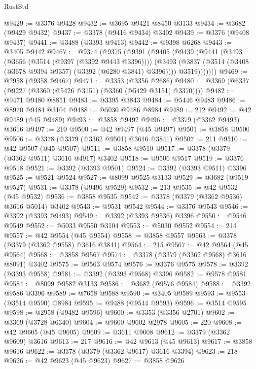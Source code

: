\begin{lexlean}{RustStd}
\begin{coremodule}
@9429 := @3376 @9428
@9432 := @3695 @9421 @8450 @3133
@9434 := @3682 (@9429 @9432)
@9437 := @3378 (@9416 @9434) @3402
@9439 := @3376 (@9408 @9437)
@9441 := @3488 (@3393 @9413)
@9442 := @9398 @6268
@9443 := @3405 @9442
@9467 := @9374
    (@9375
      (@9391
        (@9405
          (@9439
            (@9441
              (@3493
                (@3656 (@3514 (@9397 (@3392 @9443 @3396))))
                (@3493
                  (@3837 (@3514 (@3408 (@3678 @9394 @9357) (@3392 (@6280 @3841) @3396))))
                  @3519)))))))
@9469 := @2958 (@9358 @9467)
@9471 := @3353 (@3356 @2686)
@9480 := @3369 (@6337 (@9227 (@3360 (@5426 @3151) (@3360 (@5429 @3151) @3370))))
@9482 := @9471 @9480 @8851
@9483 := @3395 @3843
@9484 := @5446 @9483
@9486 := @8970 @9484 @3104
@9488 := @5030 @9486 @8984
@9489 := 212
@9492 := @42 @9489 (@45 @9489)
@9493 := @3858 @9492
@9496 := @3379 (@3362 @9493) @3616
@9497 := 210
@9500 := @42 @9497 (@45 @9497)
@9501 := @3858 @9500
@9506 := @3378 (@3379 (@3362 @9501) @3616 @3841)
@9507 := 211
@9510 := @42 @9507 (@45 @9507)
@9511 := @3858 @9510
@9517 := @3378 (@3379 (@3362 @9511) @3616 @4917) @3402
@9518 := @9506 @9517
@9519 := @3376 @9518
@9521 := @3392 (@3393 @9501)
@9524 := @3392 (@3393 @9511) @3396
@9525 := @9521 @9524
@9527 := @8099 @9525 @3133
@9529 := @3682 (@9519 @9527)
@9531 := @3378 (@9496 @9529)
@9532 := 213
@9535 := @42 @9532 (@45 @9532)
@9536 := @3858 @9535
@9542 := @3378 (@3379 (@3362 @9536) @3616 @5014) @3402
@9543 := @9531 @9542
@9544 := @3376 @9543
@9546 := @3392 (@3393 @9493)
@9549 := @3392 (@3393 @9536) @3396
@9550 := @9546 @9549
@9552 := @5033 @9550 @3104
@9553 := @5030 @9552
@9554 := 214
@9557 := @42 @9554 (@45 @9554)
@9558 := @3858 @9557
@9563 := @3378 (@3379 (@3362 @9558) @3616 @3841)
@9564 := 215
@9567 := @42 @9564 (@45 @9564)
@9568 := @3858 @9567
@9574 := @3378 (@3379 (@3362 @9568) @3616 @8091) @3402
@9575 := @9563 @9574
@9576 := @3376 @9575
@9578 := @3392 (@3393 @9558)
@9581 := @3392 (@3393 @9568) @3396
@9582 := @9578 @9581
@9584 := @8099 @9582 @3133
@9586 := @3682 (@9576 @9584)
@9588 := @3392 @9586 @3396
@9589 := @7658 @9588
@9590 := @3405 @9589
@9593 := @9553 (@3514 @9590) @8984
@9595 := @9488 (@9544 @9593)
@9596 := @3514 @9595
@9598 := @2958 (@9482 @9596)
@9600 := @3353 (@3356 @2701)
@9602 := @3369 (@3728 @6340)
@9604 := @9600 @9602 @2978
@9605 := 220
@9608 := @42 @9605 (@45 @9605)
@9609 := @3611 @9608
@9612 := @3379 (@3362 @9609) @3616
@9613 := 217
@9616 := @42 @9613 (@45 @9613)
@9617 := @3858 @9616
@9622 := @3378 (@3379 (@3362 @9617) @3616 @3394)
@9623 := 218
@9626 := @42 @9623 (@45 @9623)
@9627 := @3858 @9626

\end{coremodule}
\end{lexlean}
